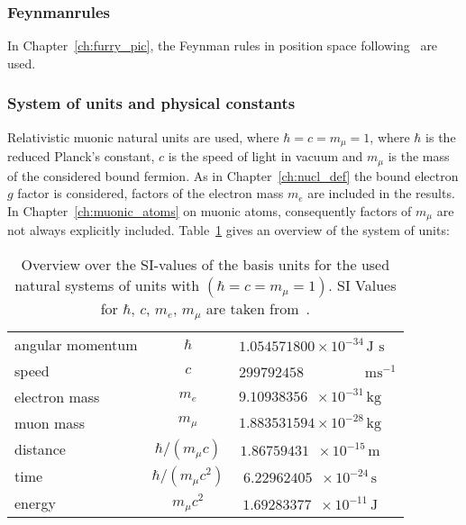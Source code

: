 \subsubsection{Feynmanrules}
In Chapter~\ref{ch:furry_pic}, the Feynman rules in position space following~\cite{itzykson2005} are used.

\newpage
\subsubsection{System of units and physical constants}
Relativistic muonic natural units are used, where $\hbar=c=m_\mu=1$, where $\hbar$ is the reduced Planck's constant, $c$ is the speed of light in vacuum and $m_\mu$ is the mass of the considered bound fermion. As in Chapter~\ref{ch:nucl_def} the bound electron $g$ factor is considered, factors of the electron mass $m_e$ are included in the results. In Chapter~\ref{ch:muonic_atoms} on muonic atoms, consequently factors of $m_\mu$ are not always explicitly included. Table~\ref{tab:units} gives an overview of the system of units:\\[1.5cm]

\begin{table}[h]
\caption{\label{tab:units}Overview over the SI-values of the basis units for the used natural systems of units with $(\hbar=c=m_\mu=1)$. SI Values for $\hbar$, $c$, $m_e$, $m_\mu$ are taken from~\cite{codata2016}.}
\centering\setcellgapes{4pt}\makegapedcells
\begin{tabular}{lc|cc}
\\
angular momentum &$\hbar$ & \multicolumn{2}{l}{$1.054571800 \times 10^{-34} \,\text{J s}$} \\
speed &$c$ & \multicolumn{2}{l}{$299792458 \,\phantom{\times 1001 ^{-34}} \text{ms}^{-1}$}\\
electron mass &$m_e$ & \multicolumn{2}{l}{$9.10938356\phantom{0}\times 10^{-31}\, \text{kg} $}\\
muon mass &$m_\mu$ & \multicolumn{2}{l}{$1.883531594 \times 10^{-28} \,\text{kg}$}\\[15pt]
distance & $\hbar/(m_\mu c)$ & $1.86759431\phantom{1}\times 10^{-15}\,\text{m}$\\
time & $\hbar /(m_\mu c^2)$ & $6.22962405\phantom{1}\times 10^{-24}\,\text{s}$\\
energy & $m_\mu c^2$ & $1.69283377\phantom{1}\times 10^{-11}\,\text{J}$\\
\end{tabular}
\end{table}

